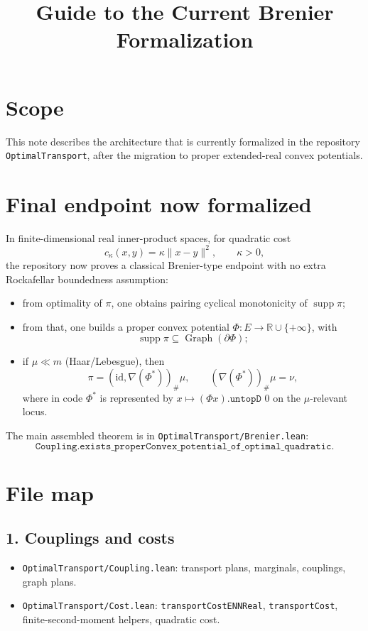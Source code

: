 \documentclass[11pt]{article}
\title{Guide to the Current Brenier Formalization}
\author{}
\date{}
\begin{document}
\maketitle

\section*{Scope}
This note describes the architecture that is currently formalized in the repository
\texttt{OptimalTransport}, after the migration to proper extended-real convex potentials.

\section*{Final endpoint now formalized}
In finite-dimensional real inner-product spaces, for quadratic cost
\[
  c_\kappa(x,y)=\kappa\|x-y\|^2,\qquad \kappa>0,
\]
the repository now proves a classical Brenier-type endpoint with no extra Rockafellar boundedness
assumption:

\begin{itemize}
\item from optimality of \(\pi\), one obtains pairing cyclical monotonicity of
  \(\operatorname{supp}\pi\);
\item from that, one builds a proper convex potential \(\Phi:E\to\mathbb R\cup\{+\infty\}\),
  with
  \[
    \operatorname{supp}\pi \subseteq \operatorname{Graph}(\partial \Phi);
  \]
\item if \(\mu\ll m\) (Haar/Lebesgue), then
  \[
    \pi = (\mathrm{id}, \nabla(\Phi^\ast))_{\#}\mu,
    \qquad
    (\nabla(\Phi^\ast))_{\#}\mu=\nu,
  \]
  where in code \(\Phi^\ast\) is represented by \(x\mapsto (\Phi x).\texttt{untopD }0\) on the
  \(\mu\)-relevant locus.
\end{itemize}

The main assembled theorem is in
\texttt{OptimalTransport/Brenier.lean}:
\[
  \texttt{Coupling.exists\_properConvex\_potential\_of\_optimal\_quadratic}.
\]

\section*{File map}

\subsection*{1. Couplings and costs}
\begin{itemize}
\item \texttt{OptimalTransport/Coupling.lean}: transport plans, marginals, couplings, graph plans.
\item \texttt{OptimalTransport/Cost.lean}: \texttt{transportCostENNReal}, \texttt{transportCost},
  finite-second-moment helpers, quadratic cost.
\end{itemize}
\end{document}

